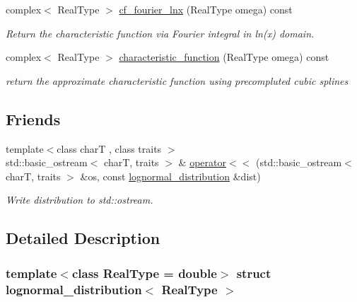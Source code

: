 \begin{DoxyCompactItemize}
complex$<$ Real\+Type $>$ \mbox{\hyperlink{structlognormal__distribution_aa9dcd144beb3c3d8985eb876604a0064}{cf\+\_\+fourier\+\_\+lnx}} (Real\+Type omega) const
\begin{DoxyCompactList}\small\item\em Return the characteristic function via Fourier integral in ln(x) domain. \end{DoxyCompactList}\item 
complex$<$ Real\+Type $>$ \mbox{\hyperlink{structlognormal__distribution_ab1a396d60f24c820883c5e593ec39e79}{characteristic\+\_\+function}} (Real\+Type omega) const
\begin{DoxyCompactList}\small\item\em return the approximate characteristic function using precompluted cubic splines \end{DoxyCompactList}\end{DoxyCompactItemize}
\subsection*{Friends}
\begin{DoxyCompactItemize}
\item 
\mbox{\label{structlognormal__distribution_a67d222a97b33b757988e03549c9449bb}} 
{\footnotesize template$<$class charT , class traits $>$ }\\std\+::basic\+\_\+ostream$<$ charT, traits $>$ \& \mbox{\hyperlink{structlognormal__distribution_a67d222a97b33b757988e03549c9449bb}{operator$<$$<$}} (std\+::basic\+\_\+ostream$<$ charT, traits $>$ \&os, const \mbox{\hyperlink{structlognormal__distribution}{lognormal\+\_\+distribution}} \&dist)
\begin{DoxyCompactList}\small\item\em Write distribution to std\+::ostream. \end{DoxyCompactList}\end{DoxyCompactItemize}


\subsection{Detailed Description}
\subsubsection*{template$<$class Real\+Type = double$>$\newline
struct lognormal\+\_\+distribution$<$ Real\+Type $>$}

